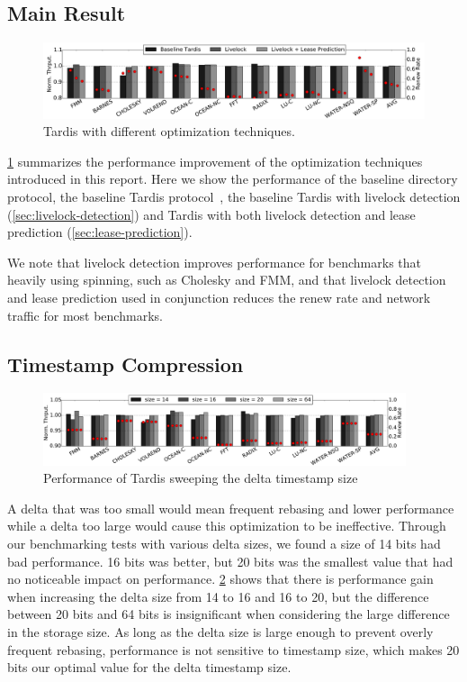\documentclass[12pt]{article}
\newcommand{\red}[1]{\textcolor{red}{#1}}
\begin{document}
\subsection{Main Result}

\begin{figure}
	\centering
	\includegraphics[width=0.95\columnwidth]{figs/main.pdf}
	\caption{ Tardis with different optimization techniques.}
	\label{fig:main}
\end{figure}

\cref{fig:main} summarizes the performance improvement of the 
optimization techniques introduced in this report. Here we show the 
performance of the baseline directory protocol, the baseline Tardis protocol~\cite{tardis}, the baseline Tardis with livelock 
detection (\cref{sec:livelock-detection}) and Tardis with both livelock 
detection and lease prediction (\cref{sec:lease-prediction}).


We note that livelock detection improves performance for benchmarks that heavily using spinning, such as Cholesky and FMM, and that livelock detection and lease prediction used in conjunction reduces the renew rate and network traffic for most benchmarks.

\subsection{Timestamp Compression}

\begin{figure}
	\centering
	\includegraphics[width=0.95\textwidth]{figs/tssize.pdf}
	\caption{ Performance of Tardis sweeping the delta timestamp size}
	\label{fig:tssize}
\end{figure}

A delta that was too small would mean frequent rebasing and lower 
performance while a delta too large would cause this optimization to 
be ineffective. Through our benchmarking tests with various delta 
sizes, we found a size of 14 bits had bad performance. 16 bits was 
better, but 20 bits was the smallest 
value that had no noticeable impact on performance. \cref{fig:tssize} shows 
that  there is performance gain when increasing the delta 
size from 14 to 16 and 16 to 20, but the difference between 20 bits and 64 
bits is insignificant when considering the large difference in the 
storage size. As long as the delta size is large enough to prevent 
overly frequent rebasing, performance is not sensitive to timestamp 
size, which makes 20 bits our optimal value for the delta timestamp 
size.
\end{document}
